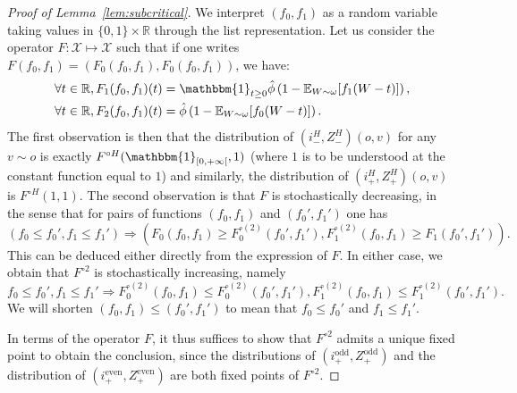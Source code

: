 \documentclass[11pt]{article}
\begin{document}
\begin{proof}[Proof of Lemma~\ref{lem:subcritical}]
We interpret $(f_0,f_1)$ as a random variable taking values in $\{0,1\} \times \mathbb{R}$ through the list representation.
Let us consider the operator $F: \mathcal X \mapsto \mathcal X$ such that if one writes $F(f_0,f_1)=(F_0(f_0,f_1),F_0(f_0,f_1))$, we have:
\begin{align*}
    \forall t \in \mathbb{R}, F_1(f_0,f_1)(t)&= \mathbbm{1}_{t \geq 0} \hat{\phi}\left(1-\mathbb{E}_{W \sim \omega}[f_1(W-t)]\right),  \\
    \forall t \in \mathbb{R}, F_2(f_0,f_1)(t)&= \hat{\phi}\left(1-\mathbb{E}_{W\sim \omega}[f_0(W-t)] \right).
\end{align*}
The first observation is then that the distribution of $(i_{-}^{H},Z_{-}^H)(o,v)$ for any $v \sim o$ is exactly $F^{\circ H}(\mathbbm{1}_{[0,+\infty[},1)$ (where $1$ is to be understood at the constant function equal to $1$) and similarly, the distribution of $(i_{+}^{H},Z_{+}^H)(o,v)$
is $F^{\circ H}(1,1)$.
The second observation is that $F$ is stochastically decreasing, in the sense that for pairs of functions $(f_0,f_1)$ and $(f_0',f_1')$ one has 
\[
\left( f_0 \leq f_0' , f_1 \leq f_1' \right)
\Longrightarrow 
\left( F_0(f_0,f_1) \geq F^{\circ(2)}_0(f_0',f_1'), F^{\circ(2)}_1(f_0,f_1) \geq F_1(f_0',f_1')\right).
\]
This can be deduced either directly from the expression of $F$.
In either case, we obtain that $F^{\circ 2}$ is stochastically increasing, namely
\[f_0 \leq f_0' , f_1 \leq f_1' \Longrightarrow F^{\circ(2)}_0(f_0,f_1) \leq F^{\circ(2)}_0(f_0',f_1'), F^{\circ(2)}_1(f_0,f_1) \leq F^{\circ(2)}_1(f_0',f_1'). \]
We will shorten $(f_0,f_1) \leq (f_0',f_1')$ to mean that $f_0 \leq f_0'$ and $f_1 \leq f_1'$.
    
In terms of the operator $F$, it thus suffices to show that $F^{\circ 2}$ admits a unique fixed point to obtain the conclusion, since the distributions of $(i_{+}^{\text{odd}},Z_+^{\text{odd}})$ and the distribution of $(i_{+}^{\text{even}},Z_+^{\text{even}})$ are both fixed points of $F^{\circ 2}$.


\end{proof}
\end{document}
